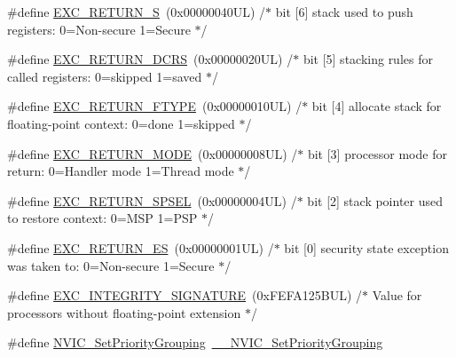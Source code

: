 \begin{DoxyCompactItemize}
\item 
\#define \hyperlink{group___c_m_s_i_s___core___n_v_i_c_functions_ga88711355d0196b1ffeb18c33e2c95360}{E\+X\+C\+\_\+\+R\+E\+T\+U\+R\+N\+\_\+S}~(0x00000040\+U\+L)     /$\ast$ bit \mbox{[}6\mbox{]} stack used to push registers\+: 0=\+Non-\/secure 1=\+Secure          $\ast$/
\item 
\#define \hyperlink{group___c_m_s_i_s___core___n_v_i_c_functions_ga0a0f2c03b4aef2c02bdae044bda1324b}{E\+X\+C\+\_\+\+R\+E\+T\+U\+R\+N\+\_\+\+D\+C\+RS}~(0x00000020\+U\+L)     /$\ast$ bit \mbox{[}5\mbox{]} stacking rules for called registers\+: 0=skipped 1=saved       $\ast$/
\item 
\#define \hyperlink{group___c_m_s_i_s___core___n_v_i_c_functions_ga342b51c3eec59822bf206e24ef881a9e}{E\+X\+C\+\_\+\+R\+E\+T\+U\+R\+N\+\_\+\+F\+T\+Y\+PE}~(0x00000010\+U\+L)     /$\ast$ bit \mbox{[}4\mbox{]} allocate stack for floating-\/point context\+: 0=done 1=skipped  $\ast$/
\item 
\#define \hyperlink{group___c_m_s_i_s___core___n_v_i_c_functions_gabb65f847769a7807395b2739cc9702d0}{E\+X\+C\+\_\+\+R\+E\+T\+U\+R\+N\+\_\+\+M\+O\+DE}~(0x00000008\+U\+L)     /$\ast$ bit \mbox{[}3\mbox{]} processor mode for return\+: 0=\+Handler mode 1=\+Thread mode      $\ast$/
\item 
\#define \hyperlink{group___c_m_s_i_s___core___n_v_i_c_functions_ga686922b26c29eac540f53a6213627466}{E\+X\+C\+\_\+\+R\+E\+T\+U\+R\+N\+\_\+\+S\+P\+S\+EL}~(0x00000004\+U\+L)     /$\ast$ bit \mbox{[}2\mbox{]} stack pointer used to restore context\+: 0=\+M\+S\+P 1=\+P\+S\+P           $\ast$/
\item 
\#define \hyperlink{group___c_m_s_i_s___core___n_v_i_c_functions_gac939dbf69d3063c76a28516a4ae84db7}{E\+X\+C\+\_\+\+R\+E\+T\+U\+R\+N\+\_\+\+ES}~(0x00000001\+U\+L)     /$\ast$ bit \mbox{[}0\mbox{]} security state exception was taken to\+: 0=\+Non-\/secure 1=\+Secure $\ast$/
\item 
\#define \hyperlink{group___c_m_s_i_s___core___n_v_i_c_functions_ga7d1b21b2d863ccd9e23a3295b3173155}{E\+X\+C\+\_\+\+I\+N\+T\+E\+G\+R\+I\+T\+Y\+\_\+\+S\+I\+G\+N\+A\+T\+U\+RE}~(0x\+F\+E\+F\+A125\+B\+U\+L)     /$\ast$ Value for processors without floating-\/point extension                $\ast$/
\item 
\#define \hyperlink{group___c_m_s_i_s___core___n_v_i_c_functions_ga0e798d5aec68cdd8263db86a76df788f}{N\+V\+I\+C\+\_\+\+Set\+Priority\+Grouping}~\hyperlink{group___c_m_s_i_s___core___n_v_i_c_functions_gafc94dcbaee03e4746ade1f5bb9aaa56d}{\+\_\+\+\_\+\+N\+V\+I\+C\+\_\+\+Set\+Priority\+Grouping}

\end{DoxyCompactItemize}
